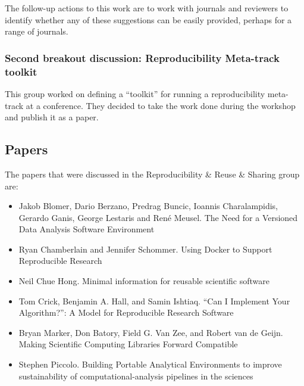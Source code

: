 \documentclass[11pt, oneside]{amsart}
\begin{document}
The follow-up actions to this work are to work with journals and reviewers to identify whether any of these suggestions can be easily provided, perhaps for a range of journals.

\subsubsection{Second breakout discussion: Reproducibility Meta-track toolkit}

This group worked on defining a ``toolkit'' for running a reproducibility meta-track at a conference. They decided to take the work done during the workshop and publish it as a paper.



\subsection{Papers}
The papers that were discussed in the Reproducibility \& Reuse \& Sharing group are:
\begin{itemize}
\item Jakob Blomer, Dario Berzano, Predrag Buncic, Ioannis Charalampidis,
Gerardo Ganis, George Lestaris and Ren\'{e} Meusel. The Need for a Versioned
Data Analysis Software Environment~\cite{wssspe2_blomer}

\item Ryan Chamberlain and Jennifer Schommer. Using {Docker} to Support
Reproducible Research~\cite{wssspe2_chamberlain}

\item Neil Chue Hong. Minimal information for reusable scientific
software~\cite{wssspe2_chue_hong}

\item Tom Crick, Benjamin A. Hall, and Samin Ishtiaq. ``Can I Implement Your
Algorithm?'': A Model for Reproducible Research Software~\cite{wssspe2_crick}

\item Bryan Marker, Don Batory, Field G. Van Zee, and Robert van de Geijn. Making
Scientific Computing Libraries Forward Compatible~\cite{wssspe2_marker}

\item Stephen Piccolo. Building Portable Analytical Environments to improve
sustainability of computational-analysis pipelines in the
sciences~\cite{wssspe2_piccolo}
\end{itemize}
\end{document}
